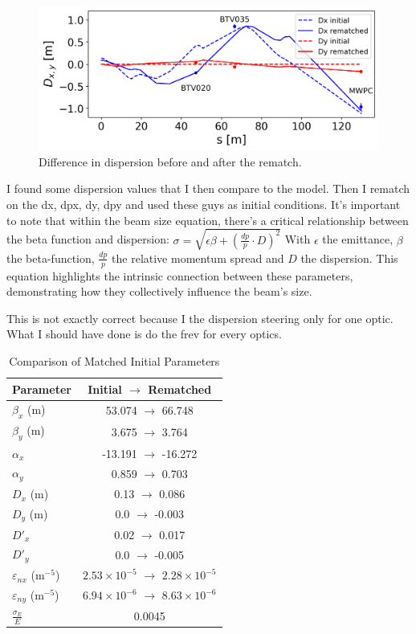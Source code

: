 \documentclass[a4paper,
               biblatex,     %
               ]{jacow}
\begin{document}
\begin{figure}[!htb]
   \centering
   \includegraphics*[width=1.0\columnwidth]{dispersion_diff.png}
   \caption{Difference in dispersion before and after the rematch.}
   \label{fig:dispersion}
\end{figure}

I found some dispersion values that I then compare to the model. Then I rematch on the dx, dpx, dy, dpy and used these guys as initial conditions. It's important to note that within the beam size equation, there's a critical relationship between the beta function and dispersion: $ \sigma = \sqrt{\epsilon \beta + \left(\frac{dp}{p}\cdot D\right)^{2}} $
With $\epsilon$ the emittance, $\beta$ the beta-function, $\frac{dp}{p}$ the relative momentum spread and $D$ the dispersion. This equation highlights the intrinsic connection between these parameters, demonstrating how they collectively influence the beam's size.


This is not exactly correct because I the dispersion steering only for one optic. What I should have done is do the frev for every optics.

\begin{table}[h!]
    \centering
    \caption{Comparison of Matched Initial Parameters}
    \label{tab:initial_conditions_comparison_single_col}
    \begin{tabular}{l c}
        \hline
        Parameter & Initial \(\rightarrow\) Rematched \\
        \hline
        $\beta_x$ (m) & 53.074 \(\rightarrow\) 66.748 \\
        $\beta_y$ (m) & 3.675 \(\rightarrow\) 3.764 \\
        $\alpha_x$ & -13.191 \(\rightarrow\) -16.272 \\
        $\alpha_y$ & 0.859 \(\rightarrow\) 0.703 \\
        $D_x$ (m) & 0.13 \(\rightarrow\) 0.086 \\
        $D_y$ (m) & 0.0 \(\rightarrow\) -0.003 \\
        $D'_x$ & 0.02 \(\rightarrow\) 0.017 \\
        $D'_y$ & 0.0 \(\rightarrow\) -0.005 \\
        $\varepsilon_{nx}$ ($\text{m}^{-5}$) & $2.53 \times 10^{-5}$ \(\rightarrow\) $2.28 \times 10^{-5}$ \\
        $\varepsilon_{ny}$ ($\text{m}^{-5}$) & $6.94 \times 10^{-6}$ \(\rightarrow\) $8.63 \times 10^{-6}$ \\
        $\frac{\sigma_{E}}{E}$ & 0.0045 \\
        \hline
    \end{tabular}
\end{table}
\end{document}

